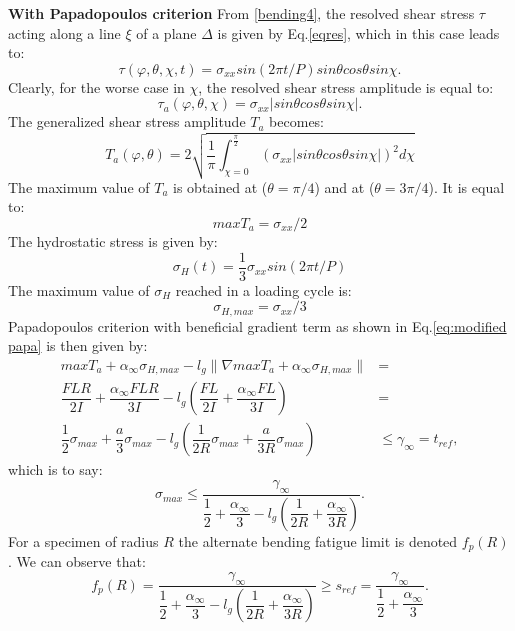 \documentclass[3p,times,procedia,number]{elsarticle}
\begin{document}
\textbf{With Papadopoulos criterion}  
From \ref{bending4}, the resolved shear stress $\tau$ acting along a line $\xi$ of a plane $\Delta$ is given by Eq.\ref{eqres}, which in this case leads to:
\begin{equation}
\tau(\varphi,\theta,\chi,t)=\sigma_{xx}sin(2\pi t/P)sin\theta cos\theta sin\chi.
\end{equation}
Clearly, for the worse case in $\chi$,  the resolved shear stress amplitude is equal to:
\begin{equation}
\tau_a(\varphi,\theta,\chi)=\sigma_{xx}|sin\theta cos\theta sin\chi|.
\end{equation}
The generalized shear stress amplitude $T_a$ becomes:
\begin{equation}
T_a(\varphi,\theta)=2\sqrt{\dfrac{1}{\pi}\int_{\chi=0}^{\frac{\pi}{2}}(\sigma_{xx}|sin\theta cos\theta sin\chi|)^2d\chi}
\end{equation}
The maximum value of $T_a$ is obtained at ($\theta=\pi/4$) and at ($\theta=3\pi/4$). It is equal to:
\begin{equation}
maxT_a=\sigma_{xx}/2
\end{equation}
The hydrostatic stress is given by:
\begin{equation}
\sigma_{H}(t)=\dfrac{1}{3}\sigma_{xx}sin(2\pi t/P)
\end{equation}
The maximum value of $\sigma_H$ reached in a loading cycle is:
\begin{equation}
\sigma_{H,max}=\sigma_{xx}/3
\end{equation}
Papadopoulos criterion with beneficial gradient term as shown in Eq.\eqref{eq:modified papa} is then given by:
\begin{equation}
\begin{split}
maxT_a+\alpha_\infty\sigma_{H,max}-l_g\parallel\nabla{maxT_a}+\alpha_\infty\sigma_{H,max}\parallel&=\\\dfrac{FLR}{2I} +\dfrac{\alpha_\infty FLR}{3I}-l_g\left( \dfrac{FL}{2I}+\dfrac{\alpha_\infty FL}{3I}\right) &=\\ \dfrac{1}{2}\sigma_{max}+\dfrac{a}{3}\sigma_{max}-l_g\left( \dfrac{1}{2R}\sigma_{max}+\dfrac{a}{3R}\sigma_{max}\right) &\leqslant \gamma_\infty = t_{ref} ,
\end{split}
\end{equation}
which is to say:
\begin{equation}
\sigma_{max}\leqslant\dfrac{\gamma_\infty}{\dfrac{1}{2}+\dfrac{\alpha_\infty}{3}-l_g(\dfrac{1}{2R}+\dfrac{\alpha_\infty}{3R})} .
\end{equation}
For a specimen of radius $R$
the alternate bending fatigue limit is denoted $f_p(R)$.
We can observe that:
\begin{equation}
f_p(R)=\dfrac{\gamma_\infty}{\dfrac{1}{2}+\dfrac{\alpha_\infty}{3}-l_g\left( \dfrac{1}{2R}+\dfrac{\alpha_\infty}{3R}\right) }\geqslant s_{ref} = \dfrac{\gamma_\infty}{\dfrac{1}{2}+\dfrac{\alpha_\infty}{3}}.
\label{papa-fr}
\end{equation}
\end{document}
